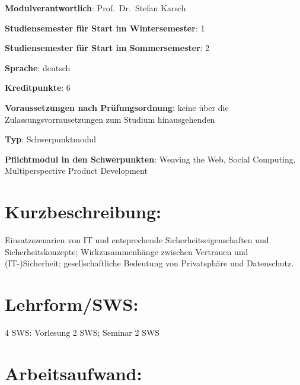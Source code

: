 \begin{modulHead}
\textbf{Modulverantwortlich}: Prof.~Dr.~Stefan
Karsch
\end{modulHead}
\begin{modulHead}
\textbf{Studiensemester für
Start im Wintersemester}:
1
\end{modulHead}
\begin{modulHead}
\textbf{Studiensemester für Start
im Sommersemester}:
2
\end{modulHead}
\begin{modulHead}
\textbf{Sprache}:
deutsch
\end{modulHead}
\begin{modulHead}
\textbf{Kreditpunkte}:
6
\end{modulHead}
\begin{modulHead}
\textbf{Voraussetzungen nach
Prüfungsordnung}: keine über die Zulassungsvorrausetzungen zum Studium
hinausgehenden
\end{modulHead}
\begin{modulHead}
\textbf{Typ}:
Schwerpunktmodul
\end{modulHead}
\begin{modulHead}
\textbf{Pflichtmodul
in den Schwerpunkten}: Weaving the Web, Social Computing,
Multiperspective Product Development
\end{modulHead}


\section*{Kurzbeschreibung:\label{/mi-2017/modulbeschreibungen-master/MA_WTW_Modul_IT-Sicherheit}}\label{kurzbeschreibungpathlabelmi-2017modulbeschreibungen-mastermaux5fwtwux5fmodulux5fit-sicherheit}

Einsatzszenarien von IT und entsprechende Sicherheitseigenschaften und
Sicherheitskonzepte; Wirkzusammenhänge zwischen Vertrauen und
(IT-)Sicherheit; gesellschaftliche Bedeutung von Privatsphäre und
Datenschutz.

\section*{Lehrform/SWS:\label{/mi-2017/modulbeschreibungen-master/MA_WTW_Modul_IT-Sicherheit}}\label{lehrformswspathlabelmi-2017modulbeschreibungen-mastermaux5fwtwux5fmodulux5fit-sicherheit}

4 SWS: Vorlesung 2 SWS; Seminar 2 SWS

\section*{Arbeitsaufwand:\label{/mi-2017/modulbeschreibungen-master/MA_WTW_Modul_IT-Sicherheit}}\label{arbeitsaufwandpathlabelmi-2017modulbeschreibungen-mastermaux5fwtwux5fmodulux5fit-sicherheit}

